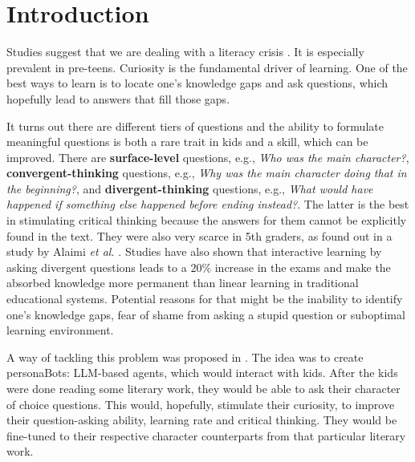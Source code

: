 \documentclass[fleqn,moreauthors,10pt]{ds_report}
\affiliation{\textit{Advisors: Slavko Žitnik}}
\begin{document}
\flushbottom 

\maketitle 
 
\thispagestyle{empty}


\section*{Introduction}

Studies suggest that we are dealing with a literacy crisis \cite{nielen_digital_2018}. It is especially prevalent in pre-teens.
Curiosity is the fundamental driver of learning. One of the best ways to learn is to locate one's knowledge gaps and ask questions, which hopefully lead to answers that fill those gaps.

It turns out there are different tiers of questions and the ability to
formulate meaningful questions is both a rare trait in kids and a skill,
which can be improved. There are \textbf{surface-level} questions, e.g., 
\emph{Who was the main character?}, \textbf{conver\-gent-thinking}
questions, e.g., \emph{Why was the main character doing that in the
beginning?}, and \textbf{divergent-thinking} questions, e.g., \emph{What
would have happened if something else happened before ending instead?}.
The latter is the best in stimulating critical thinking because the
answers for them cannot be explicitly found in the text. They were also
very scarce in 5th graders, as found out in a study by Alaimi
\emph{et al.} \cite{alaimi_pedagogical_2020}. Studies have also shown that
interactive learning by asking divergent questions leads to a $20\%$ 
increase in the exams and make the absorbed knowledge more permanent
than linear learning in traditional educational systems. Potential reasons 
for that might be the inability to identify one's knowledge gaps,
fear of shame from asking a stupid question or suboptimal learning
environment.

A way of tackling this problem was proposed in \cite{alaimi_pedagogical_2020}. The idea was to create personaBots: LLM-based agents, which would interact with kids. After the kids were done reading some literary work, they would be able to ask their character of choice questions. This would, hopefully, stimulate their curiosity, to improve their question-asking ability, learning rate and critical thinking. They would be fine-tuned to their respective character counterparts from that particular literary work. 
\end{document}
